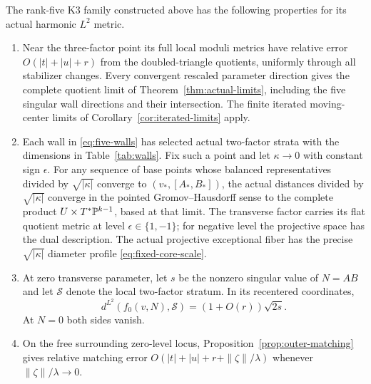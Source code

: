 \begin{theorem}\label{thm:k3-application}
The rank-five K3 family constructed above has the following
properties for its actual harmonic $L^2$ metric.
\begin{enumerate}
\item Near the three-factor point its full local moduli metrics
have relative error $O(|t|+|u|+r)$ from the doubled-triangle
quotients, uniformly through all stabilizer changes.
Every convergent rescaled parameter direction gives the complete
quotient limit of Theorem~\ref{thm:actual-limits}, including the
five singular wall directions and their intersection.
The finite iterated moving-center limits of
Corollary~\ref{cor:iterated-limits} apply.
\item Each wall in \eqref{eq:five-walls} has selected actual
two-factor strata with the dimensions in Table~\ref{tab:walls}.
Fix such a point and let $\kappa\to0$ with constant sign $\epsilon$.
For any sequence of base points whose balanced representatives divided
by $\sqrt{|\kappa|}$ converge to $(v_*,[A_*,B_*])$, the actual
distances divided by $\sqrt{|\kappa|}$ converge in the pointed
Gromov--Hausdorff sense to the complete product
$U\times T^*\mathbb P^{k-1}$, based at that limit. The transverse factor
carries its flat quotient metric at level $\epsilon\in\{1,-1\}$;
for negative level the projective space has the dual description.
The actual projective exceptional fiber
has the precise $\sqrt{|\kappa|}$ diameter profile
\eqref{eq:fixed-core-scale}.
\item At zero transverse parameter, let $s$ be the nonzero singular
value of $N=AB$ and let $\mathcal S$ denote the local two-factor
stratum. In its recentered coordinates,
\[
 d^{L^2}(f_0(v,N),\mathcal S)
   =(1+O(r))\sqrt{2s}.
\]
At $N=0$ both sides vanish.
\item On the free surrounding zero-level locus,
Proposition~\ref{prop:outer-matching} gives relative matching
error $O(|t|+|u|+r+\|\zeta\|/\lambda)$ whenever
$\|\zeta\|/\lambda\to0$.
\end{enumerate}
\end{theorem}
